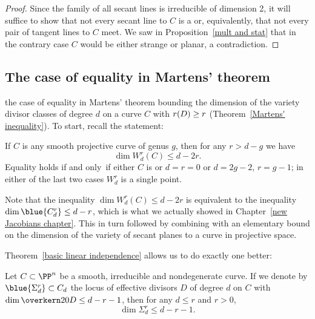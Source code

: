 \begin{proof}
Since the family of all secant lines is irreducible of dimension 2,  it
will suffice to show that not every secant line to $C$ is a 
%
or, equivalently, that not every pair of tangent lines to $C$
meet. We saw in Proposition~\ref{mult and stat} that in the contrary
case 
$C$ would be either strange or planar, a contradiction.
\end{proof}


\subsection*{The case of equality in Martens' theorem}

the case
of equality in 
%
Martens' theorem
bounding the dimension of the variety
%
divisor classes of degree $d$ on a curve $C$
with $r(D) \geq\nobreak r$
(Theorem~\ref{Martens' inequality}).
To start, recall the statement:

\begin{theorem}[Martens]\label{full Martens}
If $C$ is any smooth projective curve of genus $g$, then for any $r>d-g$
we have
$$
\dim W^r_d(C) \leq d-2r.
$$
Equality holds if and only~if either $C$ is 
%
or $d=r=0$ or $d=2g-2$, $r=g-1$; in either of the last two cases $W^r_d$ is
a single point.
\unif
\end{theorem}

Note that the inequality $\dim W^r_d(C) \leq d-2r$ is equivalent to the
%
inequality $\dim 
\blue{C^r_d}
\leq d-r$, which is what we actually showed
in Chapter~\ref{new Jacobians chapter}. This in turn followed by combining
%
with an elementary bound on the
dimension of the variety of secant planes to a curve in projective space.

Theorem~\ref{basic linear independence} allows us to do exactly one
better:

\begin{lemma}\label{Strong secant plane lemma}
Let $C \subset \PP^n$ be a smooth, irreducible and nondegenerate curve. If
%
we denote by $
\blue{\Sigma^r_d}
\subset C_d$ the locus of effective divisors
%
$D$ of degree $d$ on $C$ with $\dim \overkern20 D \leq d-r-1$, then for
any $d \leq r$ and $r > 0$,
$$
\dim \Sigma^r_d \leq d-r-1.
$$
\end{lemma}

